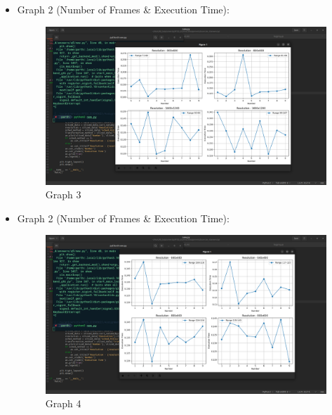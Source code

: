 \documentclass[a4paper,11pt]{article}%
\newenvironment{qanda}{\setlength{\parindent}{0pt}}{\bigskip}
\begin{document}
\begin{qanda}
\begin{enumerate}
\begin{enumerate}
\begin{itemize}
\begin{itemize}
\begin{figure}[H]
									\end{figure}
						            \item Graph 2 (Number of Frames \& Execution Time): \begin{figure}[H]
										\centering
										\includegraphics[scale=0.25]{figures/fig3.png}
										\caption{Graph 3}
									\end{figure}
						            \item Graph 2 (Number of Frames \& Execution Time): \begin{figure}[H]
										\centering
										\includegraphics[scale=0.25]{figures/fig4.png}
										\caption{Graph 4}
									\end{figure}
					            \end{itemize}

				      \end{itemize}


			\end{enumerate}


			






\end{enumerate}
\end{qanda}
\end{document}

